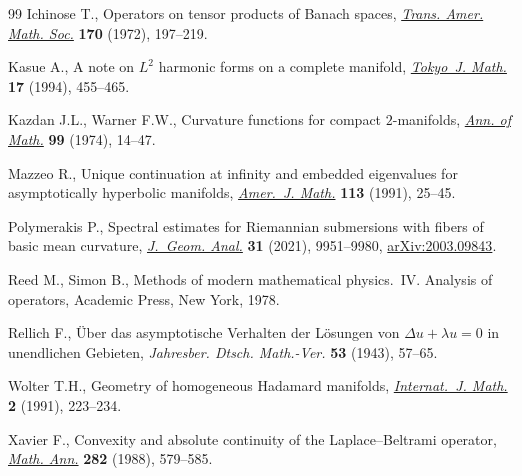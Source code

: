 \begin{thebibliography}{99}
Ichinose T., Operators on tensor products of {B}anach spaces, \href{https://doi.org/10.2307/1996304}{\textit{Trans.
 Amer. Math. Soc.}} \textbf{170} (1972), 197--219.

Kasue A., A note on {$L^2$} harmonic forms on a complete manifold,
 \href{https://doi.org/10.3836/tjm/1270127966}{\textit{Tokyo~J. Math.}} \textbf{17} (1994), 455--465.

Kazdan J.L., Warner F.W., Curvature functions for compact {$2$}-manifolds,
 \href{https://doi.org/10.2307/1971012}{\textit{Ann. of Math.}} \textbf{99} (1974), 14--47.

Mazzeo R., Unique continuation at infinity and embedded eigenvalues for
 asymptotically hyperbolic manifolds, \href{https://doi.org/10.2307/2374820}{\textit{Amer.~J. Math.}} \textbf{113}
 (1991), 25--45.

Polymerakis P., Spectral estimates for {R}iemannian submersions with fibers of
 basic mean curvature, \href{https://doi.org/10.1007/s12220-021-00634-z}{\textit{J.~Geom. Anal.}} \textbf{31} (2021), 9951--9980,
 \href{https://arxiv.org/abs/2003.09843}{arXiv:2003.09843}.

Reed M., Simon B., Methods of modern mathematical physics.~{IV}. {A}nalysis of
 operators, Academic Press, New York, 1978.

Rellich F., \"{U}ber das asymptotische {V}erhalten der {L}\"osungen von
 {$\Delta u+\lambda u=0$} in unendlichen {G}ebieten, \textit{Jahresber. Dtsch.
 Math.-Ver.} \textbf{53} (1943), 57--65.

Wolter T.H., Geometry of homogeneous {H}adamard manifolds, \href{https://doi.org/10.1142/S0129167X91000430}{\textit{Internat.~J.
 Math.}} \textbf{2} (1991), 223--234.

Xavier F., Convexity and absolute continuity of the {L}aplace--{B}eltrami
 operator, \href{https://doi.org/10.1007/BF01462884}{\textit{Math. Ann.}} \textbf{282} (1988), 579--585.

\end{thebibliography}
